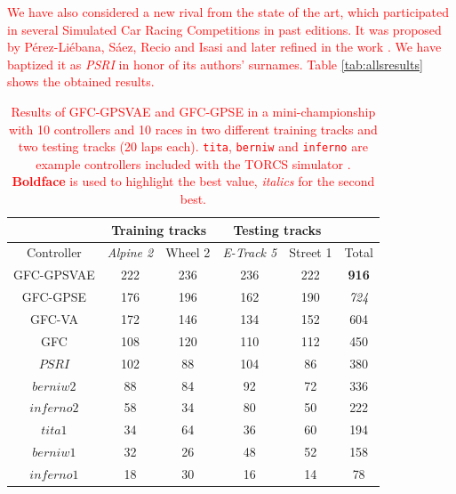 \documentclass[10pt,journal,compsoc]{IEEEtran}
\begin{document}
\textcolor{red}{
We have also considered a new rival from the state of the art, which participated in several Simulated Car Racing Competitions in past editions. 
It was proposed by P{\'e}rez-Li{\'e}bana, S{\'a}ez, Recio and Isasi
\cite{EvolvingRuleSystem08} and later refined in the work
\cite{PerezEvolvingFuzzy09}. We have baptized it as \textit{PSRI} in honor of
its authors' surnames. 
Table \ref{tab:allsresults} shows the obtained results.
%
}
\begin{table}[ht]
  \centering
  {\scriptsize
    \caption{ \textcolor{red}{Results of {\sf GFC-GPSVAE} and {\sf GFC-GPSE}
      in a mini-championship with 10 controllers
      and 10 races in two different training tracks and two testing tracks (20 laps each). {\tt tita}, {\tt berniw} and {\tt inferno} are example controllers included with the TORCS
      simulator \cite{torcs4}.  {\bf Boldface} is used to highlight the best value, {\em italics} for the second best.}}
    {
            \begin{tabular}{|c|c|c|c|c||c|}
	\hline
	& \multicolumn{2}{|c|}{Training tracks} &\multicolumn{2}{|c|}{Testing tracks} \\
	\hline
	Controller&\textit{Alpine 2} &Wheel 2&\textit{E-Track 5}  &Street 1&Total\\
        \hline
        \hline



{\sf GFC-GPSVAE}	&\cellcolor{red!25}222&	\cellcolor{red!25}236&\cellcolor{red!25}	236&\cellcolor{red!25}	222&	\cellcolor{red!25} {\bf 916}\\
{\sf GFC-GPSE}	&\cellcolor{red!25}176&	\cellcolor{red!25}196&\cellcolor{red!25}	162&\cellcolor{red!25}	190&\cellcolor{red!25}	{\em 724}\\

{\sf GFC-VA} \cite{DBLP:conf/cig/SalemMG19}&\cellcolor{red!25}172&\cellcolor{red!25}	146&\cellcolor{red!25}	134&\cellcolor{red!25}	152& \cellcolor{red!25}	604\\
{\sf GFC}  \cite{salem_cig2018}	&\cellcolor{red!25}108&\cellcolor{red!25}	120&\cellcolor{red!25}	110&\cellcolor{red!25}	112&\cellcolor{red!25}	450\\
$PSRI$\cite{PerezEvolvingFuzzy09}&\cellcolor{red!25}102&\cellcolor{red!25}	88 &\cellcolor{red!25}	104&\cellcolor{red!25}	86 &  \cellcolor{red!25}  380\\
$berniw2$		&\cellcolor{red!25}88	&\cellcolor{red!25}	84 &\cellcolor{red!25}	92 &\cellcolor{red!25}	72 &\cellcolor{red!25}	336\\
$inferno2$	&\cellcolor{red!25}58	&\cellcolor{red!25}	34 &\cellcolor{red!25}	80 &\cellcolor{red!25}	50 &\cellcolor{red!25}	222\\
$tita1$		&\cellcolor{red!25}34 &	\cellcolor{red!25}64 &\cellcolor{red!25}	36 &\cellcolor{red!25}	60 &\cellcolor{red!25}	194\\
$berniw1$		&\cellcolor{red!25}32	&\cellcolor{red!25}	26 &\cellcolor{red!25}	48 &\cellcolor{red!25}	52 &\cellcolor{red!25}	158\\
$inferno1$	&\cellcolor{red!25}18	&\cellcolor{red!25}	30 &\cellcolor{red!25}	16 &\cellcolor{red!25}	14 &\cellcolor{red!25}	78\\
\hline


\end{tabular}}}
\end{table}
\end{document}
